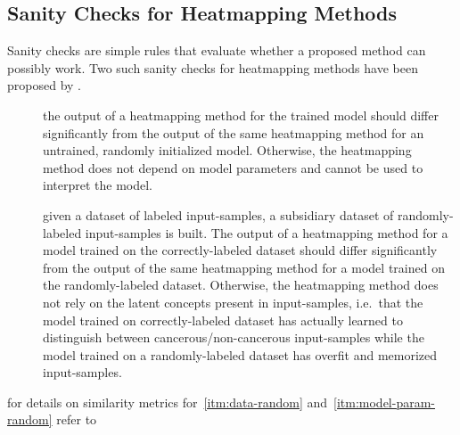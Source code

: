 \subsection{Sanity Checks for Heatmapping Methods}
Sanity checks are simple rules that evaluate whether a proposed method can possibly work. Two such sanity checks for heatmapping methods have been proposed by .

\begin{description}
    \item[]
    the output of a heatmapping method for the trained model should differ significantly from the output of the same heatmapping method for an untrained, randomly initialized model. Otherwise, the heatmapping method does not depend on model parameters and cannot be used to interpret the model.
    \item[] given a dataset of labeled input-samples, a subsidiary dataset of randomly-labeled input-samples is built. The output of a heatmapping method for a model trained on the correctly-labeled dataset should differ significantly from the output of the same heatmapping method for a model trained on the randomly-labeled dataset. Otherwise, the heatmapping method does not rely on the latent concepts present in input-samples, i.e.\ that the model trained on correctly-labeled dataset has actually learned to distinguish between cancerous/non-cancerous input-samples while the model trained on a randomly-labeled dataset has overfit and memorized input-samples.
\end{description}
for details on similarity metrics for~\ref{itm:data-random} and~\ref{itm:model-param-random} refer to~\cite{Adebayo.2018}
